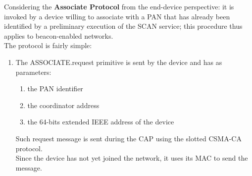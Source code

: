 Considering the \textbf{Associate Protocol} from the end-device perspective:
it is invoked by a device willing to associate with a PAN that has already been identified by a preliminary execution of the SCAN service; this procedure thus applies to beacon-enabled networks.\\
The protocol is fairly simple:
\begin{enumerate}
   \item The ASSOCIATE.request primitive is sent by the device and has as parameters:
   \begin{enumerate}
      \item the PAN identifier
      \item the coordinator address
      \item the 64-bits extended IEEE address of the device
   \end{enumerate}
   Such request message is sent during the CAP using the slotted CSMA-CA protocol.\\
   Since the device has not yet joined the network, it uses its MAC to send the message.
\end{enumerate}